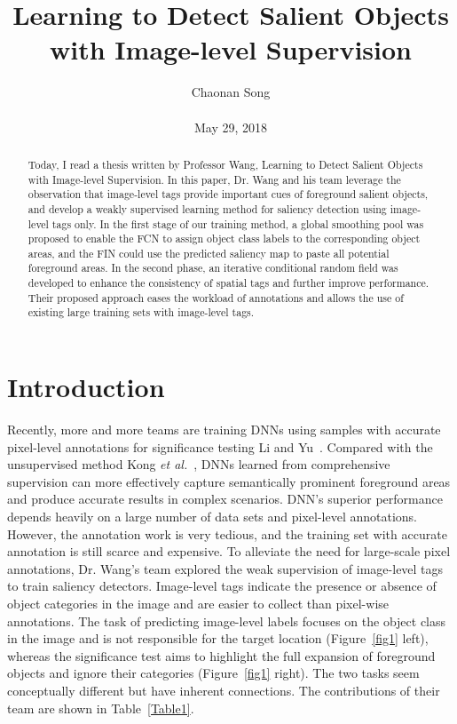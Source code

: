 \documentclass[10pt,twocolumn,letterpaper]{article}
\author{Chaonan Song \\\\
May 29, 2018}
\title{Learning to Detect Salient Objects with Image-level Supervision}
\begin{document}
    \maketitle
    \begin{abstract}
	   Today, I read a thesis written by Professor Wang, Learning to Detect Salient Objects with Image-level Supervision. In this paper, Dr. Wang and his team leverage the observation that image-level tags provide important cues of foreground salient objects, and develop a weakly supervised learning method for saliency detection using image-level tags only. In the first stage of our training method, a global smoothing pool was proposed to enable the FCN to assign object class labels to the corresponding object areas, and the FIN could use the predicted saliency map to paste all potential foreground areas. In the second phase, an iterative conditional random field was developed to enhance the consistency of spatial tags and further improve performance. Their proposed approach eases the workload of annotations and allows the use of existing large training sets with image-level tags.
    \end{abstract}
    \section{Introduction}
    Recently, more and more teams are training DNNs using samples with accurate pixel-level annotations for significance testing Li and Yu~\cite{[26]}. Compared with the unsupervised method Kong \emph{et al.}~\cite{[22]}, DNNs learned from comprehensive supervision can more effectively capture semantically prominent foreground areas and produce accurate results in complex scenarios. DNN's superior performance depends heavily on a large number of data sets and pixel-level annotations. However, the annotation work is very tedious, and the training set with accurate annotation is still scarce and expensive. To alleviate the need for large-scale pixel annotations, Dr. Wang's team explored the weak supervision of image-level tags to train saliency detectors. Image-level tags indicate the presence or absence of object categories in the image and are easier to collect than pixel-wise annotations. The task of predicting image-level labels focuses on the object class in the image and is not responsible for the target location (Figure~\ref{fig1} left), whereas the significance test aims to highlight the full expansion of foreground objects and ignore their categories (Figure~\ref{fig1} right). The two tasks seem conceptually different but have inherent connections. The contributions of their team are shown in Table~\ref{Table1}.
    
\end{document}
